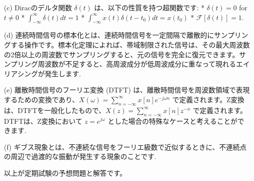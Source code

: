 \documentclass{ltjsarticle}
\begin{document}
(c) Diracのデルタ関数 $\delta(t)$ は、以下の性質を持つ超関数です:
    *   $\delta(t) = 0$ for $t \neq 0$
    *   $\int_{-\infty}^{\infty} \delta(t) dt = 1$
    *   $\int_{-\infty}^{\infty} x(t) \delta(t - t_0) dt = x(t_0)$
    *   $\mathcal{F}[\delta(t)] = 1$.

(d) 連続時間信号の標本化とは、連続時間信号を一定間隔で離散的にサンプリングする操作です。標本化定理によれば、帯域制限された信号は、その最大周波数の2倍以上の周波数でサンプリングすると、元の信号を完全に復元できます。サンプリング周波数が不足すると、高周波成分が低周波成分に重なって現れるエイリアシングが発生します.

(e) 離散時間信号のフーリエ変換 (DTFT) は、離散時間信号を周波数領域で表現するための変換であり、$X(\omega) = \sum_{n=-\infty}^{\infty} x[n] e^{-j \omega n}$ で定義されます。Z変換は、DTFTを一般化したもので、$X(z) = \sum_{n=-\infty}^{\infty} x[n] z^{-n}$ で定義されます。DTFTは、Z変換において $z=e^{j\omega}$ とした場合の特殊なケースと考えることができます.

(f) ギブス現象とは、不連続な信号をフーリエ級数で近似するときに、不連続点の周辺で過渡的な振動が発生する現象のことです.

以上が定期試験の予想問題と解答です。
\end{document}
